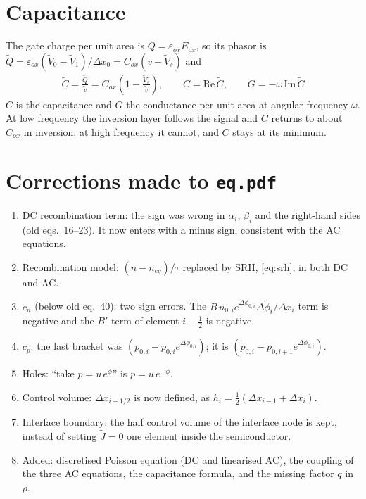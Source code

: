 \documentclass[11pt]{article}
\newcommand{\dphi}[1]{\Delta\phi_{#1}}
\newcommand{\half}{\tfrac{1}{2}}
\begin{document}
\section{Capacitance}
The gate charge per unit area is $Q=\varepsilon_{ox}E_{ox}$, so its phasor is
$\tilde Q=\varepsilon_{ox}(\tilde V_0-\tilde V_1)/\Delta x_0=C_{ox}(\tilde v-\tilde V_s)$ and
\begin{align}
\tilde C=\frac{\tilde Q}{\tilde v}=C_{ox}\left(1-\frac{\tilde V_s}{\tilde v}\right),\qquad
C=\mathrm{Re}\,\tilde C,\qquad G=-\omega\,\mathrm{Im}\,\tilde C
\end{align}
$C$ is the capacitance and $G$ the conductance per unit area at angular frequency $\omega$. At low
frequency the inversion layer follows the signal and $C$ returns to about $C_{ox}$ in inversion; at high
frequency it cannot, and $C$ stays at its minimum.

\section{Corrections made to \texttt{eq.pdf}}
\begin{enumerate}
\item DC recombination term: the sign was wrong in $\alpha_i$, $\beta_i$ and the right-hand sides (old
eqs.\ 16--23). It now enters with a minus sign, consistent with the AC equations.
\item Recombination model: $(n-n_{eq})/\tau$ replaced by SRH, \eqref{eq:srh}, in both DC and AC.
\item $c_n$ (below old eq.\ 40): two sign errors. The $B\,n_{0,i}e^{\dphi{0,i}}\Delta\tilde\phi_i/\Delta x_i$
term is negative and the $B'$ term of element $i-\half$ is negative.
\item $c_p$: the last bracket was $(p_{0,i}-p_{0,i}e^{\dphi{0,i}})$; it is $(p_{0,i}-p_{0,i+1}e^{\dphi{0,i}})$.
\item Holes: ``take $p=u\,e^{\phi}$'' is $p=u\,e^{-\phi}$.
\item Control volume: $\Delta x_{i-1/2}$ is now defined, as $h_i=\half(\Delta x_{i-1}+\Delta x_i)$.
\item Interface boundary: the half control volume of the interface node is kept, instead of setting
$\tilde J=0$ one element inside the semiconductor.
\item Added: discretised Poisson equation (DC and linearised AC), the coupling of the three AC equations, the
capacitance formula, and the missing factor $q$ in $\rho$.
\end{enumerate}
\end{document}
